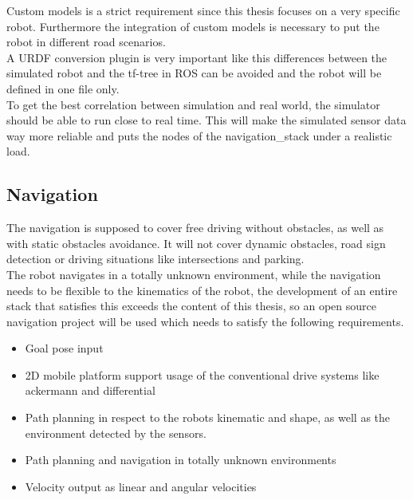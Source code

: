 Custom models is a strict requirement since this thesis focuses on a very specific robot. Furthermore the integration of custom models is necessary to put the robot in different road scenarios.\\

A URDF conversion plugin is very important like this differences between the simulated robot and the tf-tree in ROS can be avoided and the robot will be defined in one file only.\\

To get the best correlation between simulation and real world, the simulator should be able to run close to real time. This will make the simulated sensor data way more reliable and puts the nodes of the navigation\_stack under a realistic load.

\subsection{Navigation}
The navigation is supposed to cover free driving without obstacles, as well as with static obstacles avoidance. It will not cover dynamic obstacles, road sign detection or driving situations like intersections and parking.\\


The robot navigates in a totally unknown environment, while the navigation needs to be flexible to the kinematics of the robot, the development of an entire stack that satisfies this exceeds the content of this thesis, so an open source navigation project will be used which needs to satisfy the following requirements. 

\begin{itemize}
	\item Goal pose input
	\item 2D mobile platform support usage of the conventional drive systems like ackermann and differential
	\item Path planning in respect to the robots kinematic and shape, as well as the environment detected by the sensors.
	\item Path planning and navigation in totally unknown environments
	\item Velocity output as linear and angular velocities
\end{itemize}